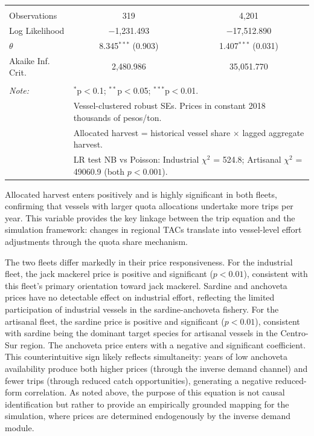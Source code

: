 \documentclass[
  11pt,
]{article}
\begin{document}
\begin{table}[!htbp]
\begin{tabular}{@{\extracolsep{5pt}}lcc}
 \hline \\[-1.8ex] 
Observations & 319 & 4,201 \\ 
Log Likelihood & $-$1,231.493 & $-$17,512.890 \\ 
$\theta$ & 8.345$^{***}$  (0.903) & 1.407$^{***}$  (0.031) \\ 
Akaike Inf. Crit. & 2,480.986 & 35,051.770 \\ 
\hline 
\hline \\[-1.8ex] 
\textit{Note:}  & \multicolumn{2}{l}{$^{*}$p$<$0.1; $^{**}$p$<$0.05; $^{***}$p$<$0.01.} \\ 
 & \multicolumn{2}{l}{Vessel-clustered robust SEs. Prices in constant 2018 thousands of pesos/ton.} \\ 
 & \multicolumn{2}{l}{Allocated harvest = historical vessel share $\times$ lagged aggregate harvest.} \\ 
 & \multicolumn{2}{l}{LR test NB vs Poisson: Industrial $\chi^2$ = 524.8; Artisanal $\chi^2$ = 49060.9 (both $p < 0.001$).} \\ 
\end{tabular} 
\end{table}

Allocated harvest enters positively and is highly significant in both fleets, confirming that vessels with larger quota allocations undertake more trips per year. This variable provides the key linkage between the trip equation and the simulation framework: changes in regional TACs translate into vessel-level effort adjustments through the quota share mechanism.

The two fleets differ markedly in their price responsiveness. For the industrial fleet, the jack mackerel price is positive and significant (\(p < 0.01\)), consistent with this fleet's primary orientation toward jack mackerel. Sardine and anchoveta prices have no detectable effect on industrial effort, reflecting the limited participation of industrial vessels in the sardine-anchoveta fishery. For the artisanal fleet, the sardine price is positive and significant (\(p < 0.01\)), consistent with sardine being the dominant target species for artisanal vessels in the Centro-Sur region. The anchoveta price enters with a negative and significant coefficient. This counterintuitive sign likely reflects simultaneity: years of low anchoveta availability produce both higher prices (through the inverse demand channel) and fewer trips (through reduced catch opportunities), generating a negative reduced-form correlation. As noted above, the purpose of this equation is not causal identification but rather to provide an empirically grounded mapping for the simulation, where prices are determined endogenously by the inverse demand module.
\end{document}
